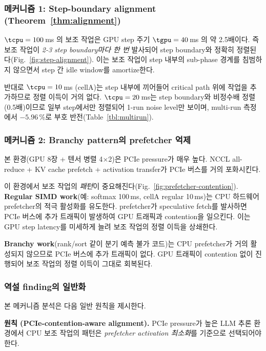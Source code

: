 \subsubsection{메커니즘 1: Step-boundary alignment (Theorem~\ref{thm:alignment})}

$\tcpu = 100$\,ms 의 보조 작업은 GPU step 주기 $\tgpu = 40$\,ms 의 약 2.5배이다.
즉 보조 작업이 \emph{2-3 step boundary마다 한 번} 발사되어 step boundary와 정확히 정렬된다(Fig.~\ref{fig:step-alignment}).
이는 보조 작업이 step 내부의 sub-phase 경계를 침범하지 않으면서 step 간 idle window를 amortize한다.

반대로 $\tcpu = 10$\,ms (cellA)는 step 내부에 끼어들어 critical path 위에 작업을 추가하므로 정렬 이득이 거의 없다.
$\tcpu = 20$\,ms는 step boundary와 비정수배 정렬(0.5배)이므로 일부 step에서만 정렬되어 1-run noise level만 보이며, multi-run 측정에서 $-5.96\,\%$로 부호 반전(Table~\ref{tbl:multirun}).

\subsubsection{메커니즘 2: Branchy pattern의 prefetcher 억제}



본 환경(GPU 8장 + 텐서 병렬 4$\times$2)은 PCIe pressure가 매우 높다.
NCCL all-reduce + KV cache prefetch + activation transfer가 PCIe 버스를 거의 포화시킨다.

이 환경에서 보조 작업의 \emph{패턴}이 중요해진다(Fig.~\ref{fig:prefetcher-contention}).
\textbf{Regular SIMD work}(예: softmax 100\,ms, cellA regular 10\,ms)는 CPU 하드웨어 prefetcher의 적극 활성화를 유도한다.
prefetcher가 speculative fetch를 발사하면 PCIe 버스에 추가 트래픽이 발생하여 GPU 트래픽과 contention을 일으킨다.
이는 GPU step latency를 미세하게 늘려 보조 작업의 정렬 이득을 상쇄한다.

\textbf{Branchy work}(rank/sort 같이 분기 예측 불가 코드)는 CPU prefetcher가 거의 활성되지 않으므로 PCIe 버스에 추가 트래픽이 없다.
GPU 트래픽이 contention 없이 진행되어 보조 작업의 정렬 이득이 그대로 회복된다.

\subsubsection{역설 finding의 일반화}

본 메커니즘 분석은 다음 일반 원칙을 제시한다.

\smallskip
\noindent\textbf{원칙 (PCIe-contention-aware alignment).}
PCIe pressure가 높은 LLM 추론 환경에서 CPU 보조 작업의 패턴은 \emph{prefetcher activation 최소화}를 기준으로 선택되어야 한다.


